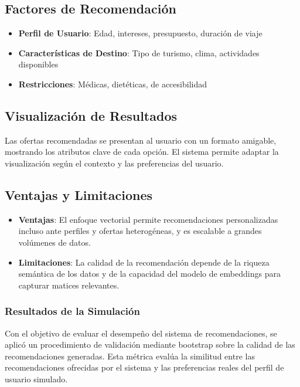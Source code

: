 \documentclass[runningheads]{llncs}
\begin{document}
\subsection{Factores de Recomendación}

\begin{itemize}
\item \textbf{Perfil de Usuario}: Edad, intereses, presupuesto, duración de viaje
\item \textbf{Características de Destino}: Tipo de turismo, clima, actividades disponibles
\item \textbf{Restricciones}: Médicas, dietéticas, de accesibilidad
\end{itemize}

\subsection{Visualización de Resultados}

Las ofertas recomendadas se presentan al usuario con un formato amigable, mostrando los atributos clave de cada opción. El sistema permite adaptar la visualización según el contexto y las preferencias del usuario.

\subsection{Ventajas y Limitaciones}

\begin{itemize}
    \item \textbf{Ventajas}: El enfoque vectorial permite recomendaciones personalizadas incluso ante perfiles y ofertas heterogéneas, y es escalable a grandes volúmenes de datos.
    \item \textbf{Limitaciones}: La calidad de la recomendación depende de la riqueza semántica de los datos y de la capacidad del modelo de embeddings para capturar matices relevantes.
\end{itemize}

\subsubsection{Resultados de la Simulación}

Con el objetivo de evaluar el desempeño del sistema de recomendaciones, se aplicó un procedimiento de validación mediante bootstrap sobre la calidad de las recomendaciones generadas. Esta métrica evalúa la similitud entre las recomendaciones ofrecidas por el sistema y las preferencias reales del perfil de usuario simulado.
\end{document}
